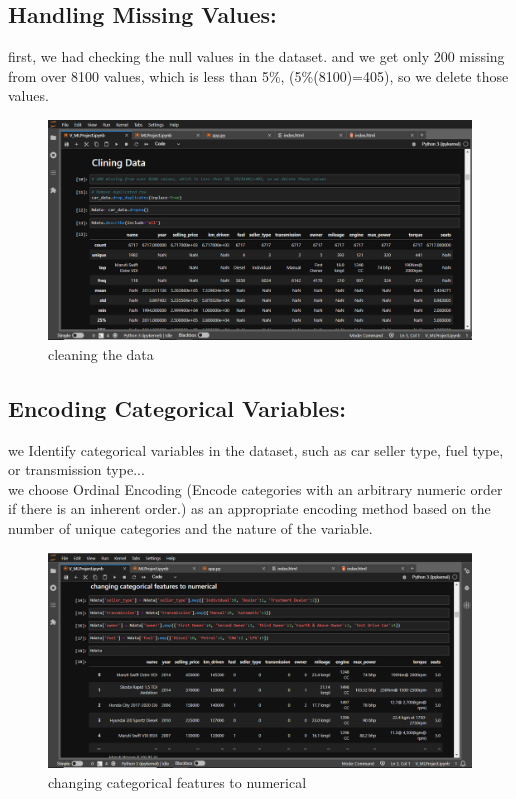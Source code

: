 \documentclass{article}
\begin{document}
\subsection{Handling Missing Values:}
first, we had checking the null values in the dataset. and we get only 200 missing from over 8100 values, which is less than 5\%, (5\%(8100)=405), so we delete those values.

\begin{figure}[h]
    \centering
    \includegraphics[width=1\textwidth]{clean.png}
    \caption{cleaning the data}
    \label{fig:my_label}
\end{figure}

\subsection{Encoding Categorical Variables:}
we Identify categorical variables in the dataset, such as car seller type, fuel type, or transmission type...\\
we choose Ordinal Encoding (Encode categories with an arbitrary numeric order if there is an inherent order.) as an appropriate encoding method based on the number of unique categories and the nature of the variable.

\begin{figure}[h]
    \centering
    \includegraphics[width=1\textwidth]{to-num.png}
    \caption{changing categorical features to numerical}
    \label{fig:my_label}
\end{figure}
\end{document}
